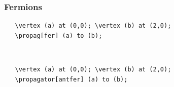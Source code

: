 \documentclass[10pt,letterpaper,twoside,notitlepage]{article}
\numberwithin{figure}{section}
\begin{document}
\subsubsection*{Fermions}
%
\begin{minipage}{0.7\linewidth}
\vercol\begin{verbatim}
   \vertex (a) at (0,0); \vertex (b) at (2,0);
   \propag[fer] (a) to (b);
\end{verbatim}\txcol
\end{minipage}
%
\begin{minipage}{0.25\linewidth}
\end{minipage}
%
\\
\begin{minipage}{0.7\linewidth}
\vercol\begin{verbatim}
   \vertex (a) at (0,0); \vertex (b) at (2,0);
   \propagator[antfer] (a) to (b);
\end{verbatim}\txcol
\end{minipage}
%
\begin{minipage}{0.25\linewidth}
\end{minipage}
%
\end{document}
